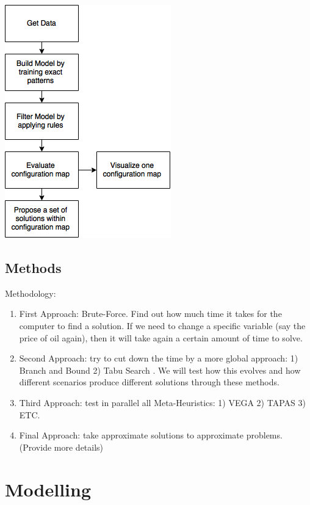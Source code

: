 \documentclass[12pt]{article}
\begin{document}
\begin{center}
\includegraphics[scale=0.75]{dataflow.png}
\end{center}

\subsection{Methods}

Methodology:
\begin{enumerate}
\item First Approach: Brute-Force. Find out how much time it takes for the computer to find a solution. If we need to change a specific variable (say the price of oil again), then it will take again a certain amount of time to solve. 
\item Second Approach: try to cut down the time by a more global approach: 1) Branch and Bound 2) Tabu Search . We will test how this evolves and how different scenarios produce different solutions through these methods. 
\item Third Approach: test in parallel all Meta-Heuristics: 1) VEGA 2) TAPAS 3) ETC. 
\item Final Approach: take approximate solutions to approximate problems. (Provide more details)

\end{enumerate}


\section{Modelling}
\end{document}
